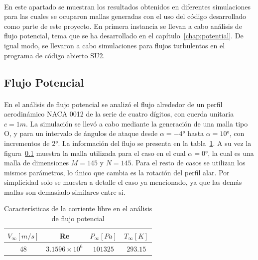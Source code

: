 \documentclass[letterpaper, openright, 12pt]{book}
\begin{document}
    \paragraph*{}
    En este apartado se muestran los resultados obtenidos en diferentes
    simulaciones para las cuales se ocuparon mallas generadas con el uso del
    código desarrollado como parte de este proyecto. En primera instancia se
    llevan a cabo análisis de flujo potencial, tema que se ha desarrollado en el
    capítulo~\ref{chap:potential}. De igual modo, se llevaron a cabo
    simulaciones para flujos turbulentos en el programa de código abierto SU2.

    \subsection{Flujo Potencial}
    \paragraph*{}
    En el análisis de flujo potencial se analizó el flujo alrededor de un perfil
    aerodinámico NACA 0012 de la serie de cuatro dígitos, con cuerda unitaria
    $c = 1 m$. La simulación se llevó a cabo mediante la generación de una malla
    tipo O, y para un intervalo de ángulos de ataque desde
    $\alpha = -4\si{\degree}$ hasta $\alpha = 10\si{\degree}$, con incrementos
    de $2\si{\degree}$. La información del flujo se presenta en la
    tabla~\ref{tabla_potencial}. A su vez la figura~\ref{} muestra la malla
    utilizada para el caso en el cual $\alpha = 0\si{\degree}$, la cual es una
    malla de dimensiones $M = 145$ y $N = 145$. Para el resto de casos se
    utilizan los mismos parámetros, lo único que cambia es la rotación del
    perfil alar. Por simplicidad solo se muestra a detalle el caso ya
    mencionado, ya que las demás mallas son demasiado similares entre si.

    \begin{table}[htbp!]
    \begin{center}
        \begin{tabular}{| c | c | c | c |}
        \hline
          $V_{\infty} [m / s]$ & Re & $P_{\infty} [Pa]$ & $T_{\infty} [K]$ \\
        \hline
          48 & $3.1596\times 10^{6}$ & $101 325$ & $293.15$ \\
        \hline
        \end{tabular}
        \caption{Características de la corriente libre en el análisis de flujo potencial}
    \label{tabla_potencial}
    \end{center}
    \end{table}
\end{document}
